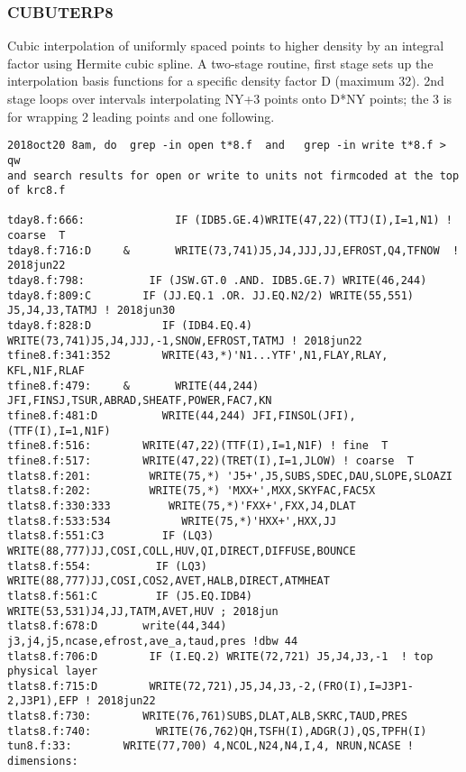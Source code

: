 \subsubsection{CUBUTERP8}

Cubic interpolation of uniformly spaced points to higher density by an integral
factor using Hermite cubic spline. A two-stage routine, first stage sets up the
interpolation basis functions for a specific density factor D (maximum 32). 2nd
stage loops over intervals interpolating NY+3 points onto D*NY points; the 3 is
for wrapping 2 leading points and one following.

\begin{verbatim}
2018oct20 8am, do  grep -in open t*8.f  and   grep -in write t*8.f > qw
and search results for open or write to units not firmcoded at the top of krc8.f

tday8.f:666:              IF (IDB5.GE.4)WRITE(47,22)(TTJ(I),I=1,N1) ! coarse  T
tday8.f:716:D     &       WRITE(73,741)J5,J4,JJJ,JJ,EFROST,Q4,TFNOW  ! 2018jun22
tday8.f:798:          IF (JSW.GT.0 .AND. IDB5.GE.7) WRITE(46,244) 
tday8.f:809:C        IF (JJ.EQ.1 .OR. JJ.EQ.N2/2) WRITE(55,551) J5,J4,J3,TATMJ ! 2018jun30
tday8.f:828:D           IF (IDB4.EQ.4) WRITE(73,741)J5,J4,JJJ,-1,SNOW,EFROST,TATMJ ! 2018jun22
tfine8.f:341:352        WRITE(43,*)'N1...YTF',N1,FLAY,RLAY, KFL,N1F,RLAF
tfine8.f:479:     &       WRITE(44,244) JFI,FINSJ,TSUR,ABRAD,SHEATF,POWER,FAC7,KN 
tfine8.f:481:D          WRITE(44,244) JFI,FINSOL(JFI), (TTF(I),I=1,N1F)
tfine8.f:516:        WRITE(47,22)(TTF(I),I=1,N1F) ! fine  T
tfine8.f:517:        WRITE(47,22)(TRET(I),I=1,JLOW) ! coarse  T
tlats8.f:201:         WRITE(75,*) 'J5+',J5,SUBS,SDEC,DAU,SLOPE,SLOAZI
tlats8.f:202:         WRITE(75,*) 'MXX+',MXX,SKYFAC,FAC5X
tlats8.f:330:333         WRITE(75,*)'FXX+',FXX,J4,DLAT
tlats8.f:533:534           WRITE(75,*)'HXX+',HXX,JJ
tlats8.f:551:C3         IF (LQ3) WRITE(88,777)JJ,COSI,COLL,HUV,QI,DIRECT,DIFFUSE,BOUNCE
tlats8.f:554:          IF (LQ3) WRITE(88,777)JJ,COSI,COS2,AVET,HALB,DIRECT,ATMHEAT
tlats8.f:561:C         IF (J5.EQ.IDB4) WRITE(53,531)J4,JJ,TATM,AVET,HUV ; 2018jun
tlats8.f:678:D       write(44,344) j3,j4,j5,ncase,efrost,ave_a,taud,pres !dbw 44
tlats8.f:706:D        IF (I.EQ.2) WRITE(72,721) J5,J4,J3,-1  ! top physical layer
tlats8.f:715:D        WRITE(72,721),J5,J4,J3,-2,(FRO(I),I=J3P1-2,J3P1),EFP ! 2018jun22
tlats8.f:730:        WRITE(76,761)SUBS,DLAT,ALB,SKRC,TAUD,PRES
tlats8.f:740:          WRITE(76,762)QH,TSFH(I),ADGR(J),QS,TPFH(I)
tun8.f:33:        WRITE(77,700) 4,NCOL,N24,N4,I,4, NRUN,NCASE ! dimensions:
\end{verbatim}   

